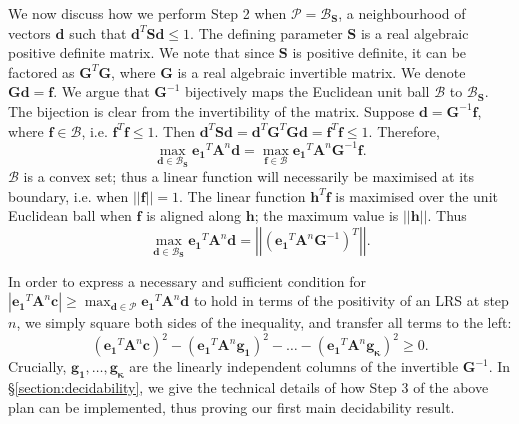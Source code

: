 We now discuss how we perform Step 2 when $\mathcal{P} = \mathcal{B}_\mathbf{S}$, a neighbourhood of vectors $\mathbf{d}$ such that $\mathbf{d}^T\mathbf{S}\mathbf{d} \le 1$. The defining parameter $\mathbf{S}$ is a real algebraic positive definite matrix. We note that since $\mathbf{S}$ is positive definite, it can be factored as $\mathbf{G}^T\mathbf{G}$, where $\mathbf{G}$ is a real algebraic invertible matrix. We denote $\mathbf{Gd} = \mathbf{f}$. We argue that $\mathbf{G}^{-1}$ bijectively maps the Euclidean unit ball $\mathcal{B}$ to $\mathcal{B}_\mathbf{S}$. The bijection is clear from the invertibility of the matrix. Suppose $\mathbf{d} = \mathbf{G}^{-1}\mathbf{f}$, where $\mathbf{f} \in \mathcal{B}$, i.e. $\mathbf{f}^T\mathbf{f} \le 1$. Then $\mathbf{d}^T\mathbf{Sd} = \mathbf{d}^T\mathbf{G}^T\mathbf{Gd} = \mathbf{f}^T\mathbf{f} \le 1.$
Therefore,
\begin{equation}
\max_{\mathbf{d} \in \mathcal{B}_\mathbf{S}} \mathbf{e_1}^T\mathbf{A}^n\mathbf{d} = \max_{\mathbf{f} \in \mathcal{B}} \mathbf{e_1}^T\mathbf{A}^n\mathbf{G}^{-1}\mathbf{f}.
\end{equation}
$\mathcal{B}$ is a convex set; thus a linear function will necessarily be maximised at its boundary, i.e. when $||\mathbf{f}|| = 1$. The linear function $\mathbf{h}^T\mathbf{f}$ is maximised over the unit Euclidean ball when $\mathbf{f}$ is aligned along $\mathbf{h}$; the maximum value is $||\mathbf{h}||$. Thus
\begin{equation}
\max_{\mathbf{d} \in \mathcal{B}_\mathbf{S}} \mathbf{e_1}^T\mathbf{A}^n\mathbf{d} = \left|\left|\left( \mathbf{e_1}^T\mathbf{A}^n\mathbf{G}^{-1} \right)^T\right|\right|.
\end{equation}

In order to express a necessary and sufficient condition for $|\mathbf{e_1}^T \mathbf{A}^n \mathbf{c}|\ge \max_{\mathbf{d} \in \mathcal{P}} \mathbf{e_1}^T\mathbf{A}^n\mathbf{d}$ to hold in terms of the positivity of an LRS at step $n$, we simply square both sides of the inequality, and transfer all terms to the left: 
\begin{equation}
\label{eq:critical}
(\mathbf{e_1}^T \mathbf{A}^n \mathbf{c})^2 - (\mathbf{e_1}^T \mathbf{A}^n \mathbf{g_1})^2 - \dots - (\mathbf{e_1}^T \mathbf{A}^n \mathbf{g_\kappa})^2 \ge 0.
\end{equation}
Crucially, $\mathbf{g_1}, \dots, \mathbf{g_\kappa}$ are the linearly independent columns of the invertible $\mathbf{G}^{-1}$. In \S\ref{section:decidability}, we give the technical details of how Step 3 of the above plan can be implemented, thus proving our first main decidability result.

